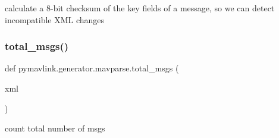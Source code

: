 \begin{DoxyVerb}calculate a 8-bit checksum of the key fields of a message, so we
   can detect incompatible XML changes\end{DoxyVerb}
 \mbox{\label{namespacepymavlink_1_1generator_1_1mavparse_a7626b3a261c60c715fcce93281b0c5d0}} 
\subsubsection{\texorpdfstring{total\+\_\+msgs()}{total\_msgs()}}
{\footnotesize\ttfamily def pymavlink.\+generator.\+mavparse.\+total\+\_\+msgs (\begin{DoxyParamCaption}\item[{}]{xml }\end{DoxyParamCaption})}

\begin{DoxyVerb}count total number of msgs\end{DoxyVerb}
 